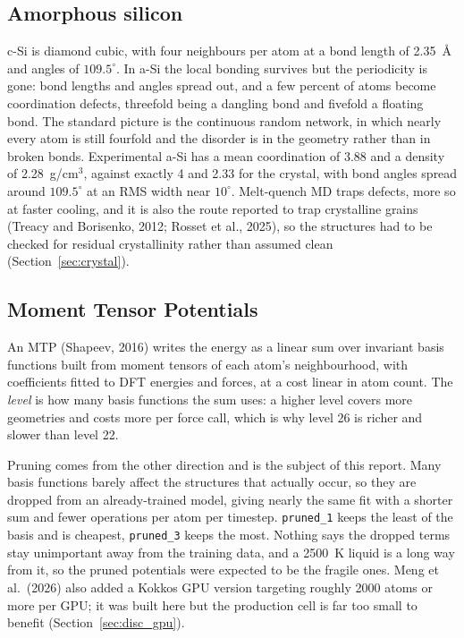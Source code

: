 \documentclass[11pt]{article}
\begin{document}
\subsection{Amorphous silicon}
c-Si is diamond cubic, with four neighbours per atom at a bond length of 2.35~\AA{} and angles of $109.5^\circ$. In a-Si the local bonding survives but the periodicity is gone: bond lengths and angles spread out, and a few percent of atoms become coordination defects, threefold being a dangling bond and fivefold a floating bond. The standard picture is the continuous random network, in which nearly every atom is still fourfold and the disorder is in the geometry rather than in broken bonds. Experimental a-Si has a mean coordination of 3.88 and a density of 2.28~g/cm$^3$, against exactly 4 and 2.33 for the crystal, with bond angles spread around $109.5^\circ$ at an RMS width near $10^\circ$. Melt-quench MD traps defects, more so at faster cooling, and it is also the route reported to trap crystalline grains (Treacy and Borisenko, 2012; Rosset et al., 2025), so the structures had to be checked for residual crystallinity rather than assumed clean (Section~\ref{sec:crystal}).

\subsection{Moment Tensor Potentials}
An MTP (Shapeev, 2016) writes the energy as a linear sum over invariant basis functions built from moment tensors of each atom's neighbourhood, with coefficients fitted to DFT energies and forces, at a cost linear in atom count. The \emph{level} is how many basis functions the sum uses: a higher level covers more geometries and costs more per force call, which is why level 26 is richer and slower than level 22.

Pruning comes from the other direction and is the subject of this report. Many basis functions barely affect the structures that actually occur, so they are dropped from an already-trained model, giving nearly the same fit with a shorter sum and fewer operations per atom per timestep. \texttt{pruned\_1} keeps the least of the basis and is cheapest, \texttt{pruned\_3} keeps the most. Nothing says the dropped terms stay unimportant away from the training data, and a 2500~K liquid is a long way from it, so the pruned potentials were expected to be the fragile ones. Meng et al.\ (2026) also added a Kokkos GPU version targeting roughly 2000 atoms or more per GPU; it was built here but the production cell is far too small to benefit (Section~\ref{sec:disc_gpu}).
\end{document}
